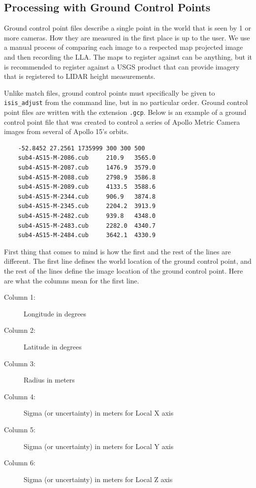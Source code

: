 \subsection{Processing with Ground Control Points}

Ground control point files describe a single point in the world that
is seen by 1 or more cameras. How they are measured in the first place
is up to the user. We use a manual process of comparing each image to
a respected map projected image and then recording the LLA. The maps
to register against can be anything, but it is recommended to register
against a USGS product that can provide imagery that is registered to
LIDAR height measurements.

Unlike match files, ground control points must specifically be given
to \texttt{isis\_adjust} from the command line, but in no particular
order. Ground control point files are written with the extension
\texttt{.gcp}. Below is an example of a ground control point file that
was created to control a series of Apollo Metric Camera images from
several of Apollo 15's orbits.

\begin{verbatim}
    -52.8452 27.2561 1735999 300 300 500
    sub4-AS15-M-2086.cub     210.9   3565.0
    sub4-AS15-M-2087.cub     1476.9  3579.0
    sub4-AS15-M-2088.cub     2798.9  3586.8
    sub4-AS15-M-2089.cub     4133.5  3588.6
    sub4-AS15-M-2344.cub     906.9   3874.8
    sub4-AS15-M-2345.cub     2204.2  3913.9
    sub4-AS15-M-2482.cub     939.8   4348.0
    sub4-AS15-M-2483.cub     2282.0  4340.7
    sub4-AS15-M-2484.cub     3642.1  4330.9
\end{verbatim}

First thing that comes to mind is how the first and the rest of the
lines are different. The first line defines the world location of the
ground control point, and the rest of the lines define the image
location of the ground control point. Here are what the columns mean
for the first line.

\begin{myindentpar}{2cm}
\begin{description}
  \item[Column 1:] Longitude in degrees
  \item[Column 2:] Latitude in degrees
  \item[Column 3:] Radius in meters
  \item[Column 4:] Sigma (or uncertainty) in meters for Local X axis
  \item[Column 5:] Sigma (or uncertainty) in meters for Local Y axis
  \item[Column 6:] Sigma (or uncertainty) in meters for Local Z axis
\end{description}
\end{myindentpar}

